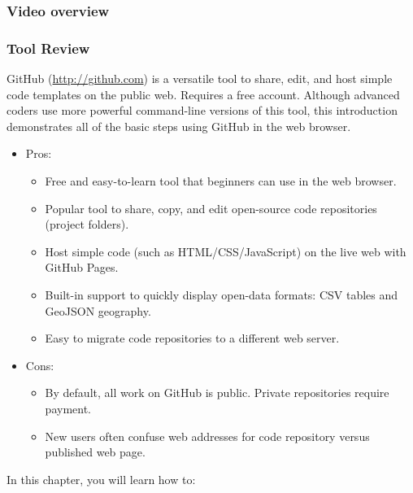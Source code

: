 \documentclass[
  english,
]{book}
\providecommand{\tightlist}{%
  \setlength{\itemsep}{0pt}\setlength{\parskip}{0pt}}
\begin{document}
\hypertarget{video-overview}{%
\subsubsection*{Video overview}\label{video-overview}}

\hypertarget{tool-review-5}{%
\subsubsection*{Tool Review}\label{tool-review-5}}

GitHub (\url{http://github.com}) is a versatile tool to share, edit, and host simple code templates on the public web. Requires a free account. Although advanced coders use more powerful command-line versions of this tool, this introduction demonstrates all of the basic steps using GitHub in the web browser.

\begin{itemize}
\tightlist
\item
  Pros:

  \begin{itemize}
  \tightlist
  \item
    Free and easy-to-learn tool that beginners can use in the web browser.
  \item
    Popular tool to share, copy, and edit open-source code repositories (project folders).
  \item
    Host simple code (such as HTML/CSS/JavaScript) on the live web with GitHub Pages.
  \item
    Built-in support to quickly display open-data formats: CSV tables and GeoJSON geography.
  \item
    Easy to migrate code repositories to a different web server.
  \end{itemize}
\item
  Cons:

  \begin{itemize}
  \tightlist
  \item
    By default, all work on GitHub is public. Private repositories require payment.
  \item
    New users often confuse web addresses for code repository versus published web page.
  \end{itemize}
\end{itemize}

In this chapter, you will learn how to:
\end{document}
